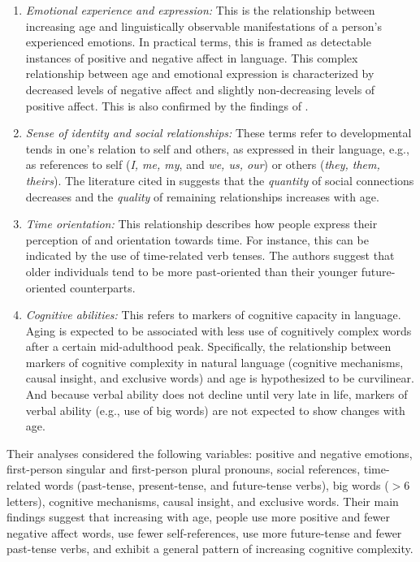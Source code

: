 \begin{enumerate}
    \item \textit{Emotional experience and expression:} This is the relationship between increasing age and linguistically observable manifestations of a person's experienced emotions. In practical terms, this is framed as detectable instances of positive and negative affect in language. This complex relationship between age and emotional expression is characterized by decreased levels of negative affect and slightly non-decreasing levels of positive affect. This is also confirmed by the findings of \cite{schler2006effects}.
    
    \item \textit{Sense of identity and social relationships:} These terms refer to developmental tends in one's relation to self and others, as expressed in their language, e.g., as references to self (\textit{I, me, my}, and \textit{we, us, our}) or others (\textit{they, them, theirs}). The literature cited in \cite{pennebaker2003words} suggests that the \textit{quantity} of social connections decreases and the \textit{quality} of remaining relationships increases with age.
    
    \item \textit{Time orientation:} This relationship describes how people express their perception of and orientation towards time. For instance, this can be indicated by the use of time-related verb tenses. The authors suggest that older individuals tend to be more past-oriented than their younger future-oriented counterparts.
    
    \item \textit{Cognitive abilities:} This refers to markers of cognitive capacity in language. Aging is expected to be associated with less use of cognitively complex words after a certain mid-adulthood peak. Specifically, the relationship between markers of cognitive complexity in natural language (cognitive mechanisms, causal insight, and exclusive words) and age is hypothesized to be curvilinear. And because verbal ability does not decline until very late in life, markers of verbal ability (e.g., use of big words) are not expected to show changes with age.
\end{enumerate}

Their analyses considered the following variables: positive and negative emotions, first-person singular and first-person plural pronouns, social references, time-related words (past-tense, present-tense, and future-tense verbs), big words ($>6$ letters), cognitive mechanisms, causal insight, and exclusive words. Their main findings suggest that increasing with age, people use more positive and fewer negative affect words, use fewer self-references, use more future-tense and fewer past-tense verbs, and exhibit a general pattern of increasing cognitive complexity.

